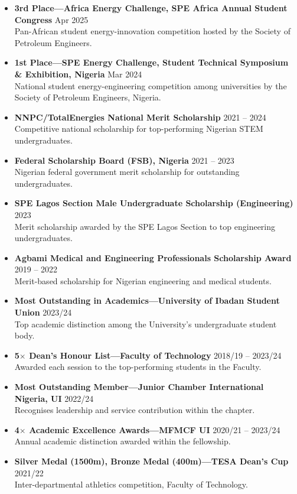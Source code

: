 \documentclass[10pt, a4paper]{article}
\begin{document}
\begin{itemize}
  \item \textbf{3rd Place---Africa Energy Challenge, SPE Africa Annual Student Congress} \hfill Apr 2025\\
        {\footnotesize Pan-African student energy-innovation competition hosted by the Society of Petroleum Engineers.}
  \item \textbf{1st Place---SPE Energy Challenge, Student Technical Symposium \& Exhibition, Nigeria} \hfill Mar 2024\\
        \footnotesize National student energy-engineering competition among universities by the Society of Petroleum Engineers, Nigeria.
  \item \textbf{NNPC/TotalEnergies National Merit Scholarship} \hfill 2021 -- 2024\\
        \footnotesize Competitive national scholarship for top-performing Nigerian STEM undergraduates.
  \item \textbf{Federal Scholarship Board (FSB), Nigeria} \hfill 2021 -- 2023\\
        \footnotesize Nigerian federal government merit scholarship for outstanding undergraduates.
  \item \textbf{SPE Lagos Section Male Undergraduate Scholarship (Engineering)} \hfill 2023\\
        \footnotesize Merit scholarship awarded by the SPE Lagos Section to top engineering undergraduates.
  \item \textbf{Agbami Medical and Engineering Professionals Scholarship Award} \hfill 2019 -- 2022\\
        \footnotesize Merit-based scholarship for Nigerian engineering and medical students.
  \item \textbf{Most Outstanding in Academics---University of Ibadan Student Union} \hfill 2023/24\\
        \footnotesize Top academic distinction among the University's undergraduate student body.
  \item \textbf{5$\times$ Dean's Honour List---Faculty of Technology} \hfill 2018/19 -- 2023/24\\
        \footnotesize Awarded each session to the top-performing students in the Faculty.
  \item \textbf{Most Outstanding Member---Junior Chamber International Nigeria, UI} \hfill 2022/24\\
        \footnotesize Recognises leadership and service contribution within the chapter.
  \item \textbf{4$\times$ Academic Excellence Awards---MFMCF UI} \hfill 2020/21 -- 2023/24\\
        \footnotesize Annual academic distinction awarded within the fellowship.
  \item \textbf{Silver Medal (1500m), Bronze Medal (400m)---TESA Dean's Cup} \hfill 2021/22\\
        \footnotesize Inter-departmental athletics competition, Faculty of Technology.
\end{itemize}
\end{document}
